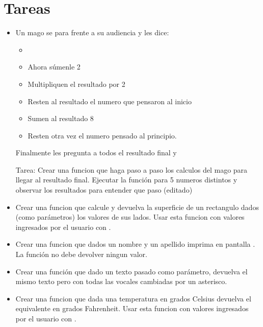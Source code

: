 \documentclass[a4paper,12pt,spanish]{sphinxmanual}
\begin{document}
\section{Tareas}
\label{\detokenize{fn:tareas}}\begin{itemize}
\item {} 
\sphinxAtStartPar
Un mago se para frente a su audiencia y les dice:
\begin{itemize}
\item {} 
\sphinxAtStartPar
{}

\item {} 
\sphinxAtStartPar
Ahora súmenle 2

\item {} 
\sphinxAtStartPar
Multipliquen el resultado por 2

\item {} 
\sphinxAtStartPar
Resten al resultado el numero que pensaron al inicio

\item {} 
\sphinxAtStartPar
Sumen al resultado 8

\item {} 
\sphinxAtStartPar
Resten otra vez el numero pensado al principio.

\end{itemize}

\sphinxAtStartPar
Finalmente les pregunta a todos el resultado final y 

\sphinxAtStartPar
Tarea:
Crear una funcion que haga paso a paso los calculos del mago para llegar al resultado final.
Ejecutar la función para 5 numeros distintos y observar los resultados para entender que paso (editado)

\item {} 
\sphinxAtStartPar
Crear una funcion que calcule y devuelva la superficie de un rectangulo
dados (como parámetros) los valores de sus lados. Usar esta funcion con
valores ingresados por el usuario con .

\item {} 
\sphinxAtStartPar
Crear una funcion que dados un nombre y un apellido imprima en pantalla
. La función no debe devolver ningun valor.

\item {} 
\sphinxAtStartPar
Crear una función que dado un texto pasado como parámetro, devuelva
el mismo texto pero con todas las vocales cambiadas por un asterisco.

\item {} 
\sphinxAtStartPar
Crear una funcion que dada una temperatura en grados Celsius devuelva
el equivalente en grados Fahrenheit. Usar esta funcion con
valores ingresados por el usuario con .

\end{itemize}
\end{document}
